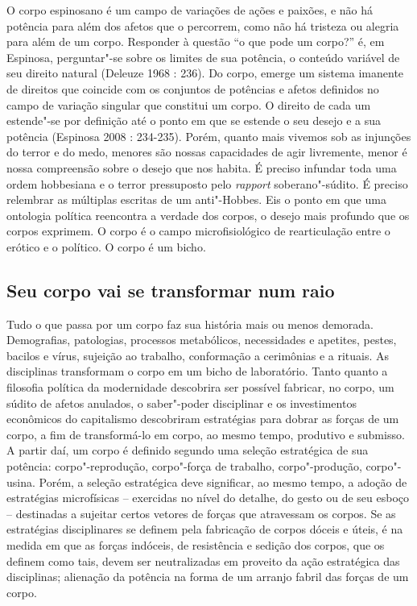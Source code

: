 O corpo espinosano é um campo de variações de ações e paixões, e não há
potência para além dos afetos que o percorrem, como não há tristeza ou
alegria para além de um corpo. Responder à questão ``o que pode um
corpo?'' é, em Espinosa, perguntar"-se sobre os limites de sua potência,
o conteúdo variável de seu direito natural (Deleuze 1968 : 236). Do
corpo, emerge um sistema imanente de direitos que coincide com os
conjuntos de potências e afetos definidos no campo de variação singular
que constitui um corpo. O direito de cada um estende"-se por definição
até o ponto em que se estende o seu desejo e a sua potência (Espinosa
2008 : 234-235). Porém, quanto mais vivemos sob as injunções do terror e
do medo, menores são nossas capacidades de agir livremente, menor é
nossa compreensão sobre o desejo que nos habita. É preciso infundar toda
uma ordem hobbesiana e o terror pressuposto pelo \emph{rapport}
soberano"-súdito. É preciso relembrar as múltiplas escritas de um
anti"-Hobbes. Eis o ponto em que uma ontologia política reencontra a
verdade dos corpos, o desejo mais profundo que os corpos exprimem. O
corpo é o campo microfisiológico de rearticulação entre o erótico e o
político. O corpo é um bicho.

\subsection{Seu corpo vai se transformar num raio}

Tudo o que passa por um
corpo faz sua história mais ou menos demorada. Demografias, patologias,
processos metabólicos, necessidades e apetites, pestes, bacilos e vírus,
sujeição ao trabalho, conformação a cerimônias e a rituais. As
disciplinas transformam o corpo em um bicho de laboratório. Tanto quanto
a filosofia política da modernidade descobrira ser possível fabricar, no
corpo, um súdito de afetos anulados, o saber"-poder disciplinar e os
investimentos econômicos do capitalismo descobriram estratégias para
dobrar as forças de um corpo, a fim de transformá-lo em corpo, ao mesmo
tempo, produtivo e submisso. A partir daí, um corpo é definido segundo
uma seleção estratégica de sua potência: corpo"-reprodução, corpo"-força
de trabalho, corpo"-produção, corpo"-usina. Porém, a seleção estratégica
deve significar, ao mesmo tempo, a adoção de estratégias microfísicas --
exercidas no nível do detalhe, do gesto ou de seu esboço -- destinadas a
sujeitar certos vetores de forças que atravessam os corpos. Se as
estratégias disciplinares se definem pela fabricação de corpos dóceis e
úteis, é na medida em que as forças indóceis, de resistência e sedição
dos corpos, que os definem como tais, devem ser neutralizadas em
proveito da ação estratégica das disciplinas; alienação da potência na
forma de um arranjo fabril das forças de um corpo.

